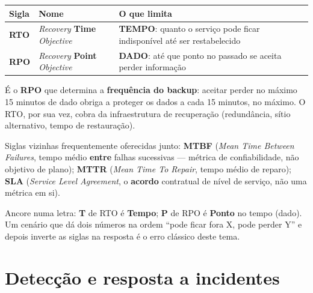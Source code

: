 \begin{conceito}
\begin{center}
\begin{tabular}{@{}p{1.6cm}p{4.4cm}p{6cm}@{}}
\toprule
\textbf{Sigla} & \textbf{Nome} & \textbf{O que limita} \\
\midrule
\textbf{RTO} & \textit{Recovery} \textbf{Time} \textit{Objective} &
\textbf{TEMPO}: quanto o serviço pode ficar indisponível até ser
restabelecido \\
\textbf{RPO} & \textit{Recovery} \textbf{Point} \textit{Objective} &
\textbf{DADO}: até que ponto no passado se aceita perder informação \\
\bottomrule
\end{tabular}
\end{center}

É o \textbf{RPO} que determina a \textbf{frequência do backup}: aceitar
perder no máximo 15 minutos de dado obriga a proteger os dados a cada 15
minutos, no máximo. O RTO, por sua vez, cobra da infraestrutura de
recuperação (redundância, sítio alternativo, tempo de restauração).

Siglas vizinhas frequentemente oferecidas junto: \textbf{MTBF}
(\textit{Mean Time Between Failures}, tempo médio \textbf{entre} falhas
sucessivas --- métrica de confiabilidade, não objetivo de plano);
\textbf{MTTR} (\textit{Mean Time To Repair}, tempo médio de reparo);
\textbf{SLA} (\textit{Service Level Agreement}, o \textbf{acordo}
contratual de nível de serviço, não uma métrica em si).
\end{conceito}

\begin{cuidado}
Ancore numa letra: \textbf{T} de RTO é \textbf{Tempo}; \textbf{P} de RPO
é \textbf{Ponto} no tempo (dado). Um cenário que dá dois números na ordem
“pode ficar fora X, pode perder Y” e depois inverte as siglas na resposta
é o erro clássico deste tema.
\end{cuidado}

\section{Detecção e resposta a incidentes}

